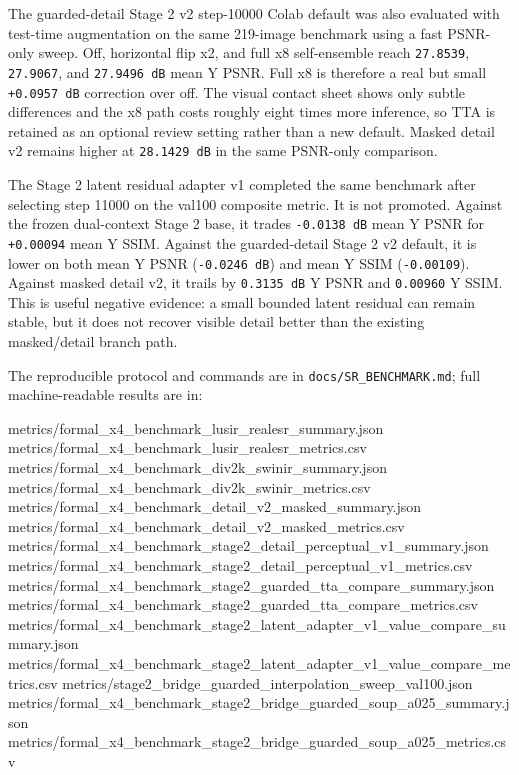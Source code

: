 \documentclass[
  10pt,
]{article}
\newenvironment{Shaded}{}{}
\newcommand{\NormalTok}[1]{#1}
\begin{document}
The guarded-detail Stage 2 v2 step-10000 Colab default was also
evaluated with test-time augmentation on the same 219-image benchmark
using a fast PSNR-only sweep. Off, horizontal flip x2, and full x8
self-ensemble reach \texttt{27.8539}, \texttt{27.9067}, and
\texttt{27.9496\ dB} mean Y PSNR. Full x8 is therefore a real but small
\texttt{+0.0957\ dB} correction over off. The visual contact sheet shows
only subtle differences and the x8 path costs roughly eight times more
inference, so TTA is retained as an optional review setting rather than
a new default. Masked detail v2 remains higher at \texttt{28.1429\ dB}
in the same PSNR-only comparison.

The Stage 2 latent residual adapter v1 completed the same benchmark
after selecting step 11000 on the val100 composite metric. It is not
promoted. Against the frozen dual-context Stage 2 base, it trades
\texttt{-0.0138\ dB} mean Y PSNR for \texttt{+0.00094} mean Y SSIM.
Against the guarded-detail Stage 2 v2 default, it is lower on both mean
Y PSNR (\texttt{-0.0246\ dB}) and mean Y SSIM (\texttt{-0.00109}).
Against masked detail v2, it trails by \texttt{0.3135\ dB} Y PSNR and
\texttt{0.00960} Y SSIM. This is useful negative evidence: a small
bounded latent residual can remain stable, but it does not recover
visible detail better than the existing masked/detail branch path.

The reproducible protocol and commands are in
\texttt{docs/SR\_BENCHMARK.md}; full machine-readable results are in:

\begin{Shaded}
\begin{Highlighting}[]
\NormalTok{metrics/formal\_x4\_benchmark\_lusir\_realesr\_summary.json}
\NormalTok{metrics/formal\_x4\_benchmark\_lusir\_realesr\_metrics.csv}
\NormalTok{metrics/formal\_x4\_benchmark\_div2k\_swinir\_summary.json}
\NormalTok{metrics/formal\_x4\_benchmark\_div2k\_swinir\_metrics.csv}
\NormalTok{metrics/formal\_x4\_benchmark\_detail\_v2\_masked\_summary.json}
\NormalTok{metrics/formal\_x4\_benchmark\_detail\_v2\_masked\_metrics.csv}
\NormalTok{metrics/formal\_x4\_benchmark\_stage2\_detail\_perceptual\_v1\_summary.json}
\NormalTok{metrics/formal\_x4\_benchmark\_stage2\_detail\_perceptual\_v1\_metrics.csv}
\NormalTok{metrics/formal\_x4\_benchmark\_stage2\_guarded\_tta\_compare\_summary.json}
\NormalTok{metrics/formal\_x4\_benchmark\_stage2\_guarded\_tta\_compare\_metrics.csv}
\NormalTok{metrics/formal\_x4\_benchmark\_stage2\_latent\_adapter\_v1\_value\_compare\_summary.json}
\NormalTok{metrics/formal\_x4\_benchmark\_stage2\_latent\_adapter\_v1\_value\_compare\_metrics.csv}
\NormalTok{metrics/stage2\_bridge\_guarded\_interpolation\_sweep\_val100.json}
\NormalTok{metrics/formal\_x4\_benchmark\_stage2\_bridge\_guarded\_soup\_a025\_summary.json}
\NormalTok{metrics/formal\_x4\_benchmark\_stage2\_bridge\_guarded\_soup\_a025\_metrics.csv}
\end{Highlighting}
\end{Shaded}
\end{document}
